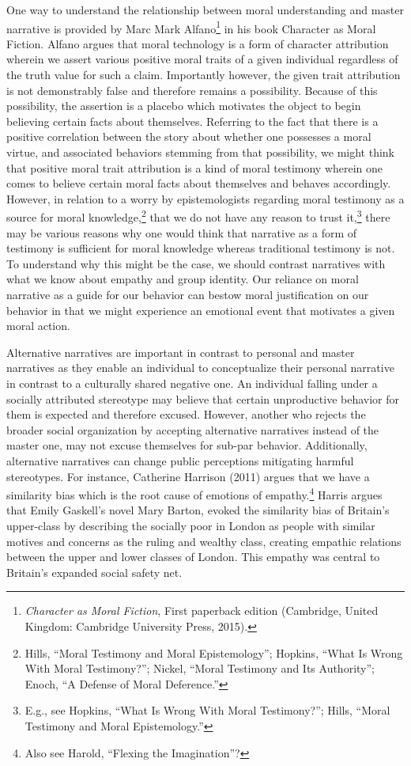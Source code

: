 \documentclass[phdthesis,12pt,final]{wuthesis}
\theoremstyle{definition}
\theoremstyle{definition}
\theoremstyle{definition}
\theoremstyle{definition}
\theoremstyle{remark}
\begin{document}
One way to understand the relationship between moral understanding and master narrative is provided by Marc Mark Alfano\footnote{\emph{Character as Moral Fiction}, First paperback edition (Cambridge, United Kingdom: Cambridge University Press, 2015).} in his book Character as Moral Fiction. Alfano argues that moral technology is a form of character attribution wherein we assert various positive moral traits of a given individual regardless of the truth value for such a claim. Importantly however, the given trait attribution is not demonstrably false and therefore remains a possibility. Because of this possibility, the assertion is a placebo which motivates the object to begin believing certain facts about themselves. Referring to the fact that there is a positive correlation between the story about whether one possesses a moral virtue, and associated behaviors stemming from that possibility, we might think that positive moral trait attribution is a kind of moral testimony wherein one comes to believe certain moral facts about themselves and behaves accordingly. However, in relation to a worry by epistemologists regarding moral testimony as a source for moral knowledge,\footnote{Hills, {``Moral Testimony and Moral Epistemology''}; Hopkins, {``What {Is Wrong With Moral Testimony}?''}; Nickel, {``Moral {Testimony} and Its {Authority}''}; Enoch, {``A {Defense} of {Moral Deference}.''}} that we do not have any reason to trust it,\footnote{E.g., see Hopkins, {``What {Is Wrong With Moral Testimony}?''}; Hills, {``Moral Testimony and Moral Epistemology.''}} there may be various reasons why one would think that narrative as a form of testimony is sufficient for moral knowledge whereas traditional testimony is not. To understand why this might be the case, we should contrast narratives with what we know about empathy and group identity. Our reliance on moral narrative as a guide for our behavior can bestow moral justification on our behavior in that we might experience an emotional event that motivates a given moral action.

Alternative narratives are important in contrast to personal and master narratives as they enable an individual to conceptualize their personal narrative in contrast to a culturally shared negative one. An individual falling under a socially attributed stereotype may believe that certain unproductive behavior for them is expected and therefore excused. However, another who rejects the broader social organization by accepting alternative narratives instead of the master one, may not excuse themselves for sub-par behavior. Additionally, alternative narratives can change public perceptions mitigating harmful stereotypes. For instance, Catherine Harrison (2011) argues that we have a similarity bias which is the root cause of emotions of empathy.\footnote{Also see Harold, {``Flexing the {Imagination}''}?} Harris argues that Emily Gaskell's novel Mary Barton, evoked the similarity bias of Britain's upper-class by describing the socially poor in London as people with similar motives and concerns as the ruling and wealthy class, creating empathic relations between the upper and lower classes of London. This empathy was central to Britain's expanded social safety net.
\end{document}
